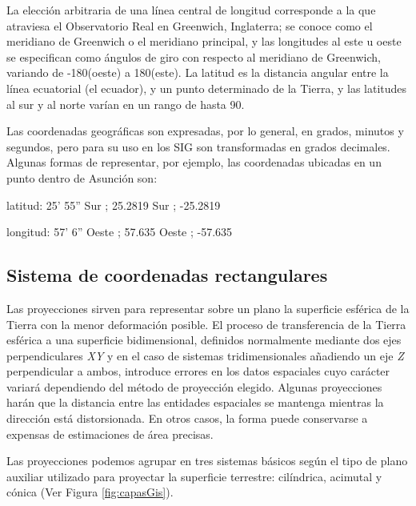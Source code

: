 La elección arbitraria de una línea central de longitud corresponde a la que atraviesa el Observatorio Real en Greenwich, Inglaterra; se conoce como el meridiano de Greenwich o el meridiano principal, y las longitudes
al este u oeste se especifican como ángulos de giro con respecto al meridiano de Greenwich, variando de -180\grad (oeste) a 180\grad (este). La latitud es la distancia angular entre la línea ecuatorial (el ecuador), y un punto determinado de la Tierra, y las latitudes al sur y al norte varían en un rango de hasta 90\grad.

Las coordenadas geográficas son expresadas, por lo general, en grados, minutos y segundos, pero para su uso en los SIG son transformadas en grados decimales. Algunas formas de representar, por ejemplo, las coordenadas ubicadas en un punto dentro de Asunción son:

latitud: 25' 55'' Sur ; 25.2819 Sur ; -25.2819

longitud: 57' 6'' Oeste ; 57.635 Oeste ; -57.635

\subsection{Sistema de coordenadas rectangulares}
Las proyecciones sirven para representar sobre un plano la superficie esférica de la Tierra con la menor deformación posible. El proceso de transferencia de la Tierra esférica a una superficie bidimensional, definidos normalmente mediante dos ejes perpendiculares \textit{XY} y en el caso de sistemas tridimensionales añadiendo un eje \textit{Z} perpendicular a ambos, introduce errores en los datos espaciales cuyo carácter variará dependiendo del método de proyección elegido. Algunas proyecciones harán que la distancia entre las entidades espaciales se mantenga mientras la dirección está distorsionada. En otros casos, la forma puede conservarse a expensas de estimaciones de área precisas.

Las proyecciones podemos agrupar en tres sistemas básicos según el tipo de plano auxiliar utilizado para proyectar la superficie terrestre: cilíndrica, acimutal y cónica (Ver Figura \ref{fig:capasGis}).

